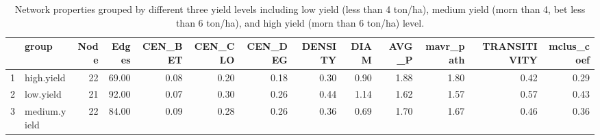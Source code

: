 \begin{table}[ht]
\centering
\begin{tabular}{rlrrrrrrrrrrr}
  \hline
 & group & Node & Edges & CEN\_BET & CEN\_CLO & CEN\_DEG & DENSITY & DIAM & AVG\_P & mavr\_path & TRANSITIVITY & mclus\_coef \\ 
  \hline
1 & high.yield &  22 & 69.00 & 0.08 & 0.20 & 0.18 & 0.30 & 0.90 & 1.88 & 1.80 & 0.42 & 0.29 \\ 
  2 & low.yield &  21 & 92.00 & 0.07 & 0.30 & 0.26 & 0.44 & 1.14 & 1.62 & 1.57 & 0.57 & 0.43 \\ 
  3 & medium.yield &  22 & 84.00 & 0.09 & 0.28 & 0.26 & 0.36 & 0.69 & 1.70 & 1.67 & 0.46 & 0.36 \\ 
   \hline
\end{tabular}
\caption{Network properties grouped by different three yield levels including low yield (less than 4 ton/ha), medium yield (morn than 4, bet less than 6 ton/ha), and high yield (morn than 6 ton/ha) level.}
\end{table}
